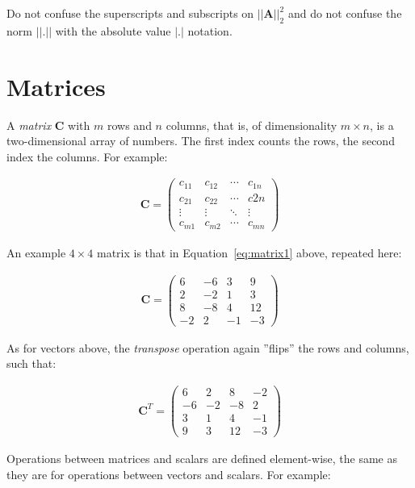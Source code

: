 Do not confuse the superscripts and subscripts on $||\mathbf{A}||^2_2$ and do not confuse the norm $||.||$ with the absolute value $|.|$ notation. 

\section{Matrices}

A \emph{matrix} $\mathbf{C}$ with $m$ rows and $n$ columns, that is, of dimensionality $m \times n$, is a two-dimensional array of numbers. The first index counts the rows, the second index the columns. For example:

\begin{align*}
\mathbf{C} = \begin{pmatrix}c_{11} & c_{12} & \cdots & c_{1n} \\
c_{21} & c_{22} & \cdots & c{2n} \\
\vdots & \vdots & \ddots & \vdots \\
c_{m1} & c_{m2} & \cdots & c_{mn} \end{pmatrix}
\end{align*}

An example $4 \times 4$ matrix is that in Equation~\ref{eq:matrix1} above, repeated here:

\begin{align*}
\mathbf{C} = \begin{pmatrix}6 & -6 & 3 & 9 \\
2 & -2 & 1 & 3 \\
8 & -8 & 4 & 12 \\
-2 & 2 & -1 & -3 \end{pmatrix}
\end{align*}

As for vectors above, the \emph{transpose} operation again ''flips'' the rows and columns, such that:

\begin{align*}
\mathbf{C}^T = \begin{pmatrix}
6 & 2 & 8 & -2 \\
-6 & -2 & -8 & 2 \\
3 & 1 & 4 & -1 \\
9 & 3 & 12 & -3 \end{pmatrix}
\end{align*}

Operations between matrices and scalars are defined element-wise, the same as they are for operations between vectors and scalars. For example:

